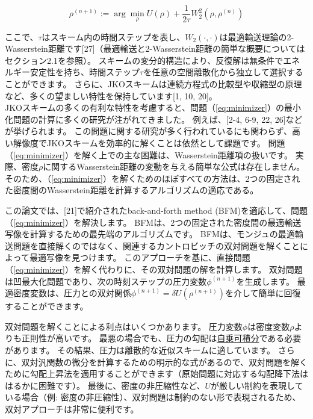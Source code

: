 \documentclass{jsarticle}
\theoremstyle{definition}
\begin{document}
\begin{equation}
    \label{eq:minimizer}
    \rho^{(n+1)} := \arg\min_{\rho} U(\rho) + \frac{1}{2\tau} W_2^2(\rho, \rho^{(n)})
\end{equation}


ここで、$\tau$はスキーム内の時間ステップを表し、$W_2(\cdot, \cdot)$は最適輸送理論の2-Wasserstein距離です[27]（最適輸送と2-Wasserstein距離の簡単な概要についてはセクション2.1を参照）。
{\color{teal}スキームの変分的構造により、}反復解は無条件でエネルギー安定性を持ち、時間ステップ$\tau$を任意の空間離散化から独立して選択することができます。
さらに、JKOスキームは連続方程式の比較型や収縮型の原理など、多くの望ましい特性を保持しています[1, 10, 20]。\\

JKOスキームの多くの有利な特性を考慮すると、問題（\ref{eq:minimizer}）の最小化問題の計算に多くの研究が注がれてきました。
例えば、[2-4, 6-9, 22, 26]などが挙げられます。
この問題に関する研究が多く行われているにも関わらず、高い解像度でJKOスキームを効率的に解くことは依然として課題です。
{\color{red}
問題（\ref{eq:minimizer}）を解く上での主な困難は、Wasserstein距離項の扱いです。
実際、密度$\rho$に関するWasserstein距離の変動を与える簡単な公式は存在しません。
そのため、（\ref{eq:minimizer}）を解くためのほぼすべての方法は、2つの固定された密度間のWasserstein距離を計算するアルゴリズムの適応である。\\
}

この論文では、[21]で紹介されたback-and-forth method (BFM)を適応して、問題（\ref{eq:minimizer}）を解決します。
BFMは、2つの固定された密度間の最適輸送写像を計算するための最先端のアルゴリズムです。
{\color{red}
BFMは、モンジュの最適輸送問題を直接解くのではなく、関連するカントロビッチの双対問題を解くことによって最適写像を見つけます。
このアプローチを基に、直接問題（\ref{eq:minimizer}）を解く代わりに、その双対問題の解を計算します。
双対問題は凹最大化問題であり、次の時刻ステップの圧力変数$\phi^{(n + 1)}$を生成します。
最適密度変数は、圧力との双対関係$\phi^{(n+1)} = \delta U(\rho^{(n+1)})$を介して簡単に回復することができます。\\
}

双対問題を解くことによる利点はいくつかあります。
圧力変数$\phi$は密度変数$\rho$よりも正則性が高いです。
最悪の場合でも、圧力の勾配は\hyperlink{自乗可積分}{自乗可積分}である必要があります。
その結果、圧力は離散的な近似スキームに適しています。
さらに、双対汎関数の微分を計算するための明示的な式があるので、双対問題を解くために勾配上昇法を適用することができます（原始問題に対応する勾配降下法ははるかに困難です）。
最後に、密度の非圧縮性など、$U$が厳しい制約を表現している場合（例: 密度の非圧縮性）、双対問題は制約のない形で表現されるため、双対アプローチは非常に便利です。\\
\end{document}
